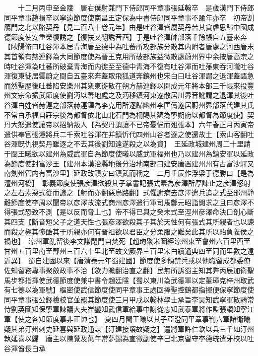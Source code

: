 　　十二月丙申至金陵　唐右僕射兼門下侍郎同平章事張延翰卒　是歲漢門下侍郎同平章事趙損卒以寧遠節度使南昌王定保為中書侍郎同平章事不踰年亦卒　初帝割鴈門之北以賂契丹【見二百八十卷元年】由是吐谷渾皆屬契丹苦其貪虐思歸中國成德節度使安重榮復誘之【復扶又翻誘音酉】于是吐谷渾帥部落千餘帳自五臺來奔【歐陽脩曰吐谷渾本居青海唐至德中為吐蕃所攻部族分散其内附者唐處之河西唐末其首領有赫連鐸為大同節度使為晉王克用所破部族益微散處蔚州界中余按唐高宗之時吐谷渾為吐蕃所破棄青海而内徙至至德中青海不復有吐谷渾而吐藩東吞河隴吐谷渾復東徙居雲蔚之間自五臺來奔蓋取飛狐道奔鎮州也宋白曰吐谷渾謂之退渾蓋語急而然聖歷後吐蕃陷安樂州其衆東徙散在朔方赫連鐸以開成元年將本部三千帳來投豐州文宗命振武節度使劉沔以善地處之及沔移鎮河東遂散居川界音訛謂之退渾其後吐谷渾白姓皆赫連之部落赫連鐸為李克用所逐歸幽州李匡儔遂居蔚州界部落代建其氏不常白承福自莊宗後為都督依北山北石門為柵賜其額為寧朔府以都督為節度使】契丹大怒遣使讓帝以招納叛人【為契丹誚讓不已帝憂悒而殂張本】六年春正月丙寅帝遣供奉官張澄將兵二千索吐谷渾在并鎮忻代四州山谷者逐之使還故土【索山客翻吐谷渾旣仇視契丹雖逐之不去其後劉知遠遂殺之以為資】　王延政城建州周二十里請于閩王曦欲以建州為威武軍自為節度使曦以威武軍福州也乃以建州為鎮安軍以延政為節度使封富沙王【建州本漢治縣地後分治地南部曰建安唐置建州州有古富沙驛又南劍州管内有富沙里】延政改鎮安曰鎮武而稱之　二月壬辰作浮梁于德勝口【是為澶州河橋】　彰義節度使張彦澤欲殺其子掌書記張式素為彦澤所厚諫止之彦澤怒射之左右素惡式從而讒之【射而亦翻惡烏路翻】式懼謝病去彦澤遣兵追之式至邠州静難節度使李周以聞帝以彦澤故流式商州彦澤遣行軍司馬鄭元昭詣闕求之且曰彦澤不得張式恐致不測【是以反而脅丄也】帝不得已與之癸未式至涇州彦澤命決口剖心斷其四支【斷音短父子之道天性也張彦澤欲殺其子其於天性何有張式其所親者也以諫而殺之極其慘酷其于所親亦何有晉祖欲以君臣之分柔服之難矣此其所以貽負義侯之禍也】　涼州軍亂留後李文謙閉門自焚死【趙珣聚米圖經涼州東至會州六百里西至甘州五百里南至鄯州三百六十里北至故突厥界三百里宋白續通典四至同而里數之遠近異】　蜀自建國以來【唐清泰元年蜀建國】節度使多領禁兵或以他職留成都委僚佐知留務專事聚斂政事不治【歛力贍翻治直之翻】民無所訴蜀主知其弊丙辰加衛聖馬步都指揮使武德節度使兼中書令趙廷隱【蜀以東川為武德軍以定董璋克梓州取武有七德以為軍號】樞密使武信節度使同平章事王處回捧聖控鶴都指揮便保寧節度使同平章事張公鐸檢校官並罷其節度使三月甲戌以翰林學士承旨李昊知武寧軍散騎常侍劉英圖知保寧軍諫議大夫崔鑾知武信軍給事中謝從志知武泰軍將作監張讚知寧江軍【使之各知節度事非正帥也】　夏四月閩王曦以其子亞澄同平章事判六軍諸衛曦疑其弟汀州刺史延喜與延政通謀【汀建接壤故疑之】遣將軍許仁欽以兵三千如汀州執延喜以歸　唐主以陳覺及萬年常夢錫為宣徽副使辛巳北京留守李德珫遣牙校以吐谷渾酋長白承

